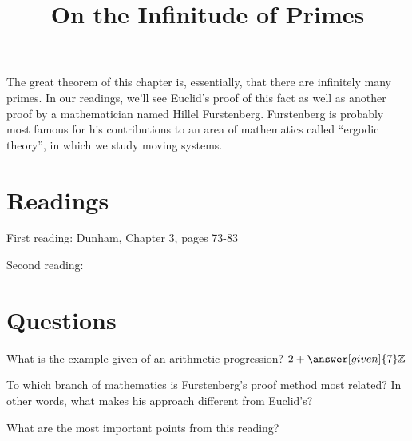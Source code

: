 \documentclass[nooutcomes]{ximera}
\title{On the Infinitude of Primes}
\begin{document}
\begin{abstract}
    
\end{abstract}
\maketitle



The great theorem of this chapter is, essentially, that there are infinitely many primes.  In our readings, we'll see Euclid's proof of this fact as well as another proof by a mathematician named Hillel Furstenberg. Furstenberg is probably most famous for his contributions to an area of mathematics called ``ergodic theory'', in which we study moving systems.


\section{Readings}
First reading: Dunham, Chapter 3, pages 73-83

Second reading: 



\section{Questions}

\begin{question}
What is the example given of an arithmetic progression? $2 + \answer[given]{7} \mathbb{Z}$
\end{question}

\begin{question}
To which branch of mathematics is Furstenberg's proof method most related?  In other words, what makes his approach different from Euclid's?
\begin{multipleChoice}
\end{multipleChoice}
\end{question}


\begin{question}
What are the most important points from this reading?
\begin{freeResponse}
\end{freeResponse}

\end{question}
\end{document}
